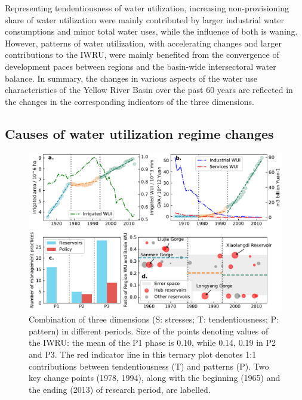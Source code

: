 \documentclass[9pt, twocolumn, twoside, lineno]{pnas-new}
\begin{document}
Representing tendentiousness of water utilization, 
increasing non-provisioning share of water utilization were mainly contributed by larger industrial water consumptions and minor total water uses, 
while the influence of both is waning.
However, patterns of water utilization, with accelerating changes and larger contributions to the IWRU, 
were mainly benefited from the convergence of development paces between regions and the basin-wide intersectoral water balance.
In summary, the changes in various aspects of the water use characteristics of the Yellow River Basin over the past 60 years 
are reflected in the changes in the corresponding indicators of the three dimensions.

\subsection*{Causes of water utilization regime changes}

\begin{figure}%
	\centering
	\includegraphics[width=\linewidth]{../../figures/main_text/causes.pdf}
	\caption{Combination of three dimensions (S: stresses; T: tendentiousness; P: pattern) in different periods. 
	Size of the points denoting values of the IWRU: the mean of the P1 phase is 0.10, while 0.14, 0.19 in P2 and P3.
	The red indicator line in this ternary plot denotes 1:1 contributions between tendentiousness (T) and patterns (P).
	Two key change points (1978, 1994), along with the beginning (1965) and the ending (2013) of research period, are labelled.}
	\label{fig:Causes}
\end{figure}
\end{document}
